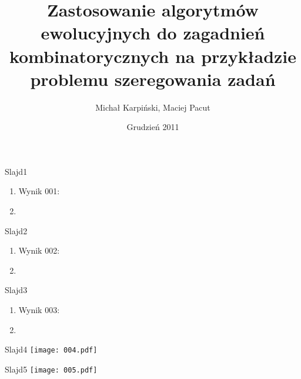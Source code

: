 \documentclass{beamer}
\title{Zastosowanie algorytmów ewolucyjnych do zagadnień kombinatorycznych na przykładzie problemu szeregowania zadań}
\author{Michał Karpiński, Maciej Pacut}
\date{Grudzień 2011}
\begin{document}
\maketitle
 
\begin{frame}{Slajd1}
  \begin{enumerate}
    \item Wynik 001:
    \item 
  \end{enumerate}
\end{frame}

\begin{frame}{Slajd2}
  \begin{enumerate}
    \item Wynik 002:
    \item 
  \end{enumerate}
\end{frame}

\begin{frame}{Slajd3}
  \begin{enumerate}
    \item Wynik 003:
    \item 
  \end{enumerate}
\end{frame}

\begin{frame}{Slajd4}
  \texttt{[image: 004.pdf]}
\end{frame}

\begin{frame}{Slajd5}
  \texttt{[image: 005.pdf]}
\end{frame}
\end{document}

